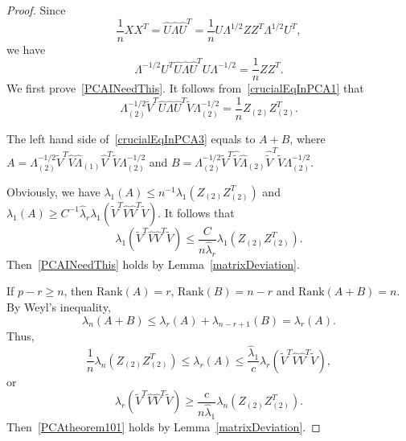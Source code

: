 \begin{proof}

    Since
    \begin{equation*}
        \frac{1}{n}XX^T=\hat{U}\hat{\Lambda}\hat{U}^T=
        \frac{1}{n}U\Lambda^{1/2}ZZ^T \Lambda^{1/2} U^T,
    \end{equation*}
    we have
    \begin{equation}\label{crucialEqInPCA1}
        \Lambda^{-1/2}U^T \hat{U}\hat{\Lambda}\hat{U}^T U\Lambda^{-1/2}=
        \frac{1}{n}ZZ^T. 
    \end{equation}
    We first prove~\eqref{PCAINeedThis}.
    It follows from~\eqref{crucialEqInPCA1} that
    \begin{equation}\label{crucialEqInPCA3}
        \Lambda^{-1/2}_{(2)}\tilde{V}^T \hat{U}\hat{\Lambda}\hat{U}^T \tilde{V}\Lambda^{-1/2}_{(2)}=
        \frac{1}{n}Z_{(2)} Z_{(2)}^T.
    \end{equation}

    The left hand side of~\eqref{crucialEqInPCA3} equals to $A+B$, where 
    $A= \Lambda^{-1/2}_{(2)}\tilde{V}^T \hat{V}\hat{\Lambda}_{(1)}\hat{V}^T \tilde{V}\Lambda^{-1/2}_{(2)}$ 
    and 
    $B= \Lambda^{-1/2}_{(2)}\tilde{V}^T \hat{\tilde{V}}\hat{\Lambda}_{(2)}\hat{\tilde{V}}^T \tilde{V}\Lambda^{-1/2}_{(2)}$.

    Obviously, we have $\lambda_1(A)\leq {n^{-1}} \lambda_1({Z}_{(2)} {Z}_{(2)}^T)$ and
    $
    \lambda_1(A)   \geq {C^{-1}}{\hat{\lambda}_r} \lambda_1 (\tilde{V}^T \hat{V}\hat{V}^T \tilde{V})
    $.
    It follows that 
    $$
    \lambda_1 (\tilde{V}^T \hat{V}\hat{V}^T \tilde{V})\leq 
    \frac{C}{n\hat{\lambda}_r} \lambda_1({Z}_{(2)}{Z}_{(2)}^T).
    $$
    Then~\eqref{PCAINeedThis} holds by Lemma~\ref{matrixDeviation}.
    

    If $p-r\geq n$, then $\mathrm{Rank}(A)=r$, $\mathrm{Rank}(B)=n-r$ and $\mathrm{Rank}(A+B)=n$.
    By Weyl's inequality,
    $$\lambda_n(A+B)\leq \lambda_r(A)+ \lambda_{n-r+1}(B)=\lambda_r(A).$$
    Thus, 
    $$
 \frac{1}{n}\lambda_n({Z}_{(2)}{Z}_{(2)}^T)   \leq \lambda_r(A)
    \leq  \frac{\hat{\lambda}_1}{c} \lambda_r(\tilde{V}^T \hat{V}\hat{V}^T \tilde{V}),
    $$
    or
    $$
      \lambda_r(\tilde{V}^T \hat{V}\hat{V}^T \tilde{V})
    \geq
    \frac{c}{n\hat{\lambda}_1}\lambda_n({Z}_{(2)}{Z}_{(2)}^T).
    $$
    Then~\eqref{PCAtheorem101} holds by Lemma~\ref{matrixDeviation}.



\end{proof}
